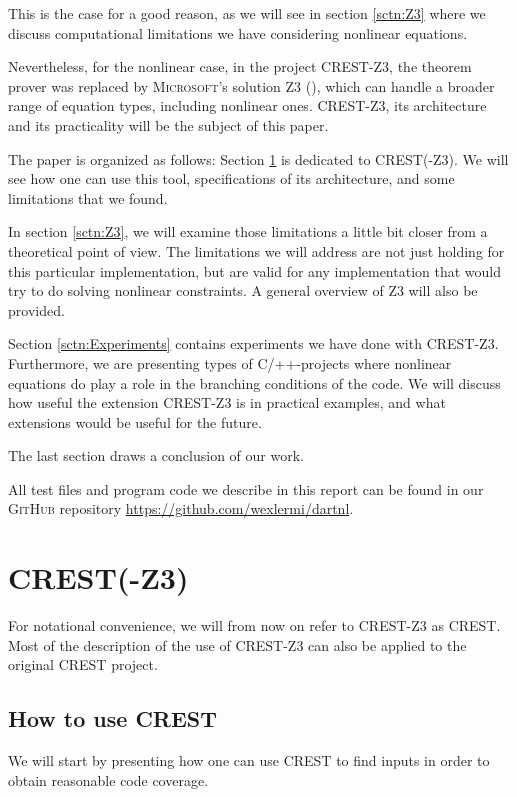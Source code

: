 \documentclass[oribibl]{llncs}
\begin{document}
This is the case for a good reason, as we will see in section \ref{sctn:Z3} where we discuss computational limitations we have considering nonlinear equations.

Nevertheless, for the nonlinear case, in the project \textsc{CREST-Z3}, the theorem prover was replaced
by \textsc{Microsoft'}s solution \textsc{Z3}
(\cite{de2008z3}), which can handle a broader range of equation types,
including nonlinear ones. \textsc{CREST-Z3}, its architecture and
its practicality will be the subject of this paper.

The paper is organized as follows: Section \ref{sctn:CRESTZ3} is
dedicated to \textsc{CREST}(-\textsc{Z3}). We will see how one can use
this tool, specifications of its architecture, and some limitations
that we found.

In section \ref{sctn:Z3}, we will examine those limitations a little
bit closer from a theoretical point of view. The limitations we will address are not just holding for this particular implementation, but are valid for any implementation that would try to do solving nonlinear constraints. A general overview of
\textsc{Z3} will also be provided.

Section \ref{sctn:Experiments} contains experiments we have done with
\textsc{CREST-Z3}. Furthermore, we are presenting types of \textsc{C/++}-projects
where nonlinear equations do play a role in the branching conditions
of the code. We will discuss how useful the extension \textsc{CREST-Z3} is in practical examples, and what extensions would be useful for the future.

The last section draws a conclusion of our work.

All test files and program code we describe in this report can be found in our \textsc{GitHub} repository \url{https://github.com/wexlermi/dartnl}.


\section{\textsc{CREST}(-\textsc{Z3})}
\label{sctn:CRESTZ3}

For notational convenience, we will from now on refer to
\textsc{CREST-Z3} as \textsc{CREST}. Most of the description of the
use of \textsc{CREST-Z3} can also be applied to the original
\textsc{CREST} project.

\subsection{How to use \textsc{CREST}}
We will start by presenting how one can use \textsc{CREST} to find
inputs in order to obtain reasonable code coverage.
\end{document}

